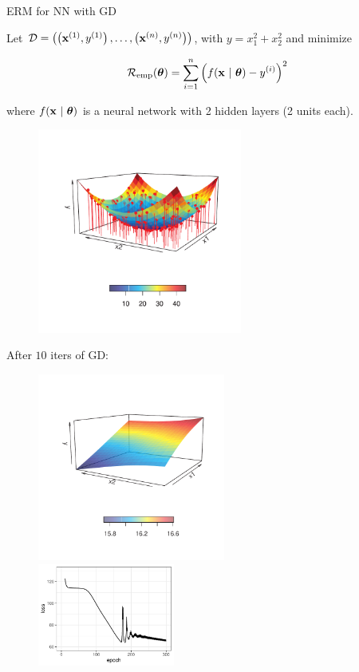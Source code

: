 \documentclass[11pt,compress,t,notes=noshow, xcolor=table]{beamer}
\begin{document}
\begin{vbframe}{ERM for NN with GD}

Let $\mathcal{D} = \left( \left(\mathbf{x}^{(1)}, y^{(1)}\right), \ldots, \left(\mathbf{x}^{(n)}, y^{(n)}\right)\right)$, with $y = x_1^2 + x_2^2$ and minimize 

\vspace*{-0.3cm}

$$
	\mathcal{R}_{\text{emp}}(\bm{\theta}) = \sum\limits_{i=1}^n \left(f(\mathbf{x} ~|~ \bm{\theta}) - y^{(i)}\right)^2
$$

\vspace*{-0.1cm}

where $f(\mathbf{x} ~|~ \bm{\theta})$ is a neural network with 2 hidden layers (2 units each). 

\vspace*{-1.5cm}

\begin{figure}
	\includegraphics[width=0.6\textwidth]{figure_man/gradient_descent_NN_0.pdf}
\end{figure}

\framebreak 

After $10$ iters of GD: 

\begin{figure}
	\includegraphics[width=0.55\textwidth]{figure_man/gradient_descent_NN_10_surface.pdf} ~~ \includegraphics[width=0.4\textwidth]{figure_man/gradient_descent_NN_300_history.pdf}
\end{figure}


\end{vbframe}
\end{document}
